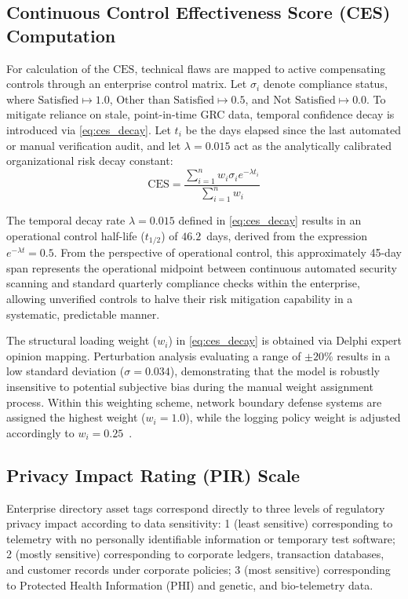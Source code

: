 \documentclass[conference,a4paper]{IEEEtran}
\begin{document}
\subsection{Continuous Control Effectiveness Score (CES) Computation}
For calculation of the $\text{CES}$, technical flaws are mapped to active compensating controls through an enterprise control matrix. Let $\sigma_i$ denote compliance status, where $\text{Satisfied} \mapsto 1.0$, $\text{Other than Satisfied} \mapsto 0.5$, and $\text{Not Satisfied} \mapsto 0.0$. To mitigate reliance on stale, point-in-time GRC data, temporal confidence decay is introduced via \eqref{eq:ces_decay}. Let $t_i$ be the days elapsed since the last automated or manual verification audit, and let $\lambda = 0.015$ act as the analytically calibrated organizational risk decay constant:
\begin{equation}
\text{CES} = \frac{\sum_{i=1}^{n} w_i \sigma_i e^{-\lambda t_i}}{\sum_{i=1}^{n} w_i}
\label{eq:ces_decay}
\end{equation}

The temporal decay rate $\lambda = 0.015$ defined in \eqref{eq:ces_decay} results in an operational control half-life ($t_{1/2}$) of $46.2$~days, derived from the expression $e^{-\lambda t} = 0.5$. From the perspective of operational control, this approximately 45-day span represents the operational midpoint between continuous automated security scanning and standard quarterly compliance checks within the enterprise, allowing unverified controls to halve their risk mitigation capability in a systematic, predictable manner. 

The structural loading weight ($w_i$) in \eqref{eq:ces_decay} is obtained via Delphi expert opinion mapping. Perturbation analysis evaluating a range of $\pm 20\%$ results in a low standard deviation ($\sigma = 0.034$), demonstrating that the model is robustly insensitive to potential subjective bias during the manual weight assignment process. Within this weighting scheme, network boundary defense systems are assigned the highest weight ($w_i = 1.0$), while the logging policy weight is adjusted accordingly to $w_i = 0.25$~\cite{b19}.

\subsection{Privacy Impact Rating (PIR) Scale}
Enterprise directory asset tags correspond directly to three levels of regulatory privacy impact according to data sensitivity: 1 (least sensitive) corresponding to telemetry with no personally identifiable information or temporary test software; 2 (mostly sensitive) corresponding to corporate ledgers, transaction databases, and customer records under corporate policies; 3 (most sensitive) corresponding to Protected Health Information (PHI) and genetic, and bio-telemetry data.
\end{document}
